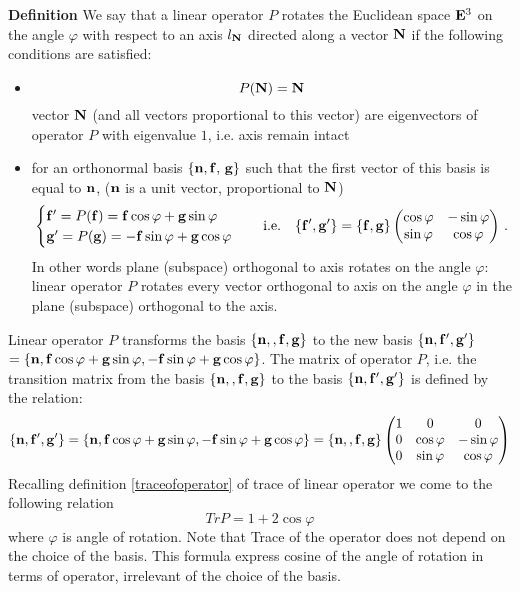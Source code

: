 \documentclass[12pt]{article}
\numberwithin{equation}{section}
\begin{document}
{\bf Definition}
We say that a linear operator $P$ rotates the Euclidean space ${\bf E}^3$
on the angle $\varphi$ with respect to
an axis $l_{\bf N}$  directed along a vector ${\bf N}$ if
the following conditions are satisfied:
\begin{itemize}
\item
      $$
  P({\bf N})={\bf N}
      $$
vector ${\bf N}$ (and all vectors proportional to this vector)
are eigenvectors of operator $P$ with eigenvalue $1$, i.e.
axis remain intact

\item

for an orthonormal basis $\{{\bf n},{\bf f},\,{\bf g}\}$
 such that the first vector of this basis is equal to ${\bf n}$,
(${\bf n}$ is a unit vector, proportional to ${\bf N}$)
    \begin{equation}\label{rotationofn=3}
                                 \begin{cases}
                      {\bf f}'=P({\bf f})={\bf f}\cos\varphi+{\bf g}\sin\varphi\cr
                      {\bf g}'=P({\bf g})=-{\bf f}\sin\varphi+{\bf g}\cos\varphi\cr
                                \end{cases}\quad
                                {\rm i.e.}\quad
                                \{{\bf f}',{\bf g}'\}=\{{\bf f},{\bf g}\}
                                 \begin{pmatrix}
                                \cos\varphi &-\sin\varphi\cr
                               \sin\varphi &\cos\varphi\cr
                              \end {pmatrix}\,.
                                 \end{equation}
  In other words  plane (subspace) orthogonal to axis
rotates on the angle $\varphi$:
        linear operator $P$ rotates every vector orthogonal to axis
         on the angle $\varphi$ in the plane (subspace) orthogonal to the axis.
\end{itemize}



   Linear operator $P$ transforms the basis $\{{\bf n},,{\bf f},{\bf g}\}$ to
the new basis
     $\{{\bf n},{\bf f}',{\bf g}'\}$ $=\{{\bf n},{\bf f}\cos\varphi+{\bf g}\sin\varphi,
-{\bf f}\sin\varphi+{\bf g}\cos\varphi\}$.
     The matrix of operator $P$, i.e. the transition matrix from the 
 basis $\{{\bf n},,{\bf f},{\bf g}\}$ to the basis
     $\{{\bf n},{\bf f}',{\bf g}'\}$ is defined by the relation:
                         \begin{equation}\label{ttt4}
   \{{\bf n},{\bf f}',{\bf g}'\}=\{{\bf n},{\bf f}\cos\varphi+{\bf g}\sin\varphi,
    -{\bf f}\sin\varphi+{\bf g}\cos\varphi\}=
   \{{\bf n},,{\bf f},{\bf g}\}\begin{pmatrix}
   1 &0 &0\cr
   0 &\cos \varphi& -\sin\varphi\cr
   0&\sin \varphi&\cos\varphi\cr
   \end{pmatrix}
                          \end{equation}
Recalling definition \eqref{traceofoperator}
of trace of linear operator we come to
the following relation
       \begin{equation}\label{eulerformula2}
    Tr P=1+2\cos\varphi
       \end{equation}
 where $\varphi$ is angle of rotation. Note that Trace of the operator
 does not depend on the choice of the basis. This formula express
 cosine of the angle of rotation in terms of operator, irrelevant of the choice of the basis.
\end{document}
